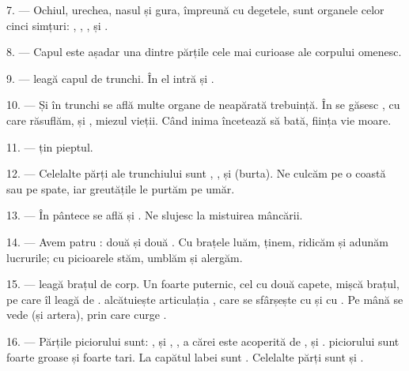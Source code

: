 7. --- Ochiul, urechea, nasul și gura, împreună cu degetele, sunt organele celor
cinci simțuri: , , ,
 și .

8. --- Capul este așadar una dintre părțile cele mai curioase ale corpului
omenesc.

\VUsaut{4.4mm}
\VUsaut{3.0mm}

9. ---  leagă capul de trunchi. În el intră  și
.

10. --- Și în trunchi se află multe organe de neapărată trebuință. În
 se găsesc , cu care răsuflăm, și ,
miezul vieții. Când inima încetează să bată, ființa vie moare.

11. ---  țin pieptul.

12. --- Celelalte părți ale trunchiului sunt , ,
 și  (burta). Ne culcăm pe o coastă sau pe spate,
iar greutățile le purtăm pe umăr.

13. --- În pântece se află  și . Ne slujesc la
mistuirea mâncării.

\VUsaut{4.4mm}
\VUsaut{3.0mm}

14. --- Avem patru : două  și două
. Cu brațele luăm, ținem, ridicăm și adunăm lucrurile; cu
picioarele stăm, umblăm și alergăm.

15. ---  leagă brațul de corp. Un  foarte puternic,
cel cu două capete, mișcă brațul, pe care  îl leagă de
.  alcătuiește articulația
, care se sfârșește cu  și cu .
Pe mână se vede  (și artera), prin care curge .

16. --- Părțile piciorului sunt: ,  și
, , a cărei  este
acoperită de ,  și .
 piciorului sunt foarte groase și foarte tari. La capătul labei
sunt . Celelalte părți sunt  și
.

